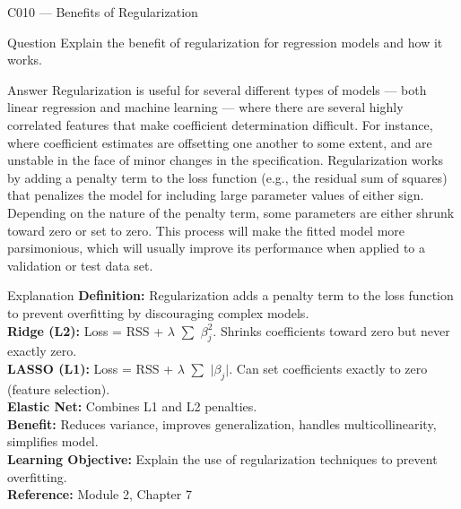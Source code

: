 \documentclass[aspectratio=169,8pt]{beamer}
\begin{document}
	\begin{frame}{C010 --- Benefits of Regularization}
		\begin{block}{Question}
			Explain the benefit of regularization for regression models and how it works.
		\end{block}
		\begin{block}{Answer}
			Regularization is useful for several different types of models --- both linear regression and machine learning --- where there are several highly correlated features that make coefficient determination difficult. For instance, where coefficient estimates are offsetting one another to some extent, and are unstable in the face of minor changes in the specification. Regularization works by adding a penalty term to the loss function (e.g., the residual sum of squares) that penalizes the model for including large parameter values of either sign. Depending on the nature of the penalty term, some parameters are either shrunk toward zero or set to zero. This process will make the fitted model more parsimonious, which will usually improve its performance when applied to a validation or test data set.
		\end{block}
		\begin{block}{Explanation}
			\textbf{Definition:} Regularization adds a penalty term to the loss function to prevent overfitting by discouraging complex models.\\
			\textbf{Ridge (L2):} Loss = RSS + $\lambda$ $\sum$ $\beta_j^2$. Shrinks coefficients toward zero but never exactly zero.\\
			\textbf{LASSO (L1):} Loss = RSS + $\lambda$ $\sum$ $|$$\beta_j$$|$. Can set coefficients exactly to zero (feature selection).\\
			\textbf{Elastic Net:} Combines L1 and L2 penalties.\\
			\textbf{Benefit:} Reduces variance, improves generalization, handles multicollinearity, simplifies model.\\
			\textbf{Learning Objective:} Explain the use of regularization techniques to prevent overfitting.\\
			\textbf{Reference:} Module 2, Chapter 7
		\end{block}
	\end{frame}
	
\end{document}
